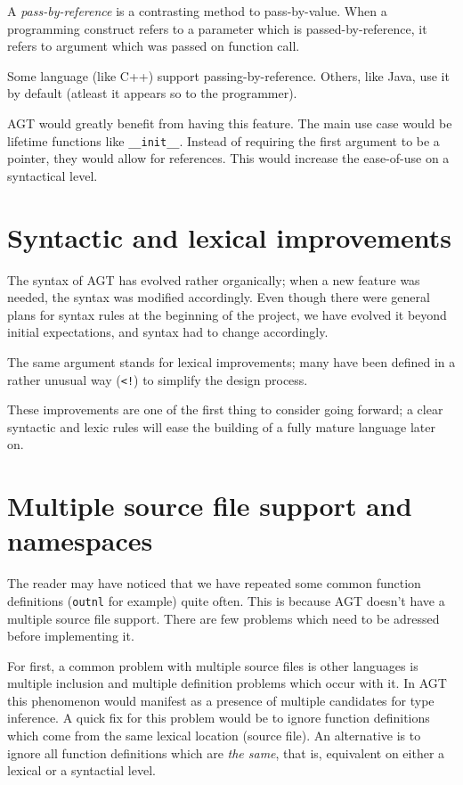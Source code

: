 \documentclass[times, utf8, diplomski]{fer}
\theoremstyle{definition}
\begin{document}
A \textit{pass-by-reference} is a contrasting method to pass-by-value. When a programming construct 
refers to a parameter which is passed-by-reference, it refers to argument which was passed on
function call.

Some language (like C++) support passing-by-reference. Others, like Java, use it by default 
(atleast it appears so to the programmer).

AGT would greatly benefit from having this feature. The main use case would be
lifetime functions like \texttt{\_\_init\_\_}. Instead of requiring the first argument to be a pointer,
they would allow for references. This would increase the ease-of-use on a syntactical level.

\section{Syntactic and lexical improvements}

The syntax of AGT has evolved rather organically; when a new feature was needed,
the syntax was modified accordingly. Even though there were general plans for syntax rules
at the beginning of the project, we have evolved it beyond initial expectations,
and syntax had to change accordingly.

The same argument stands for lexical improvements; many have been defined in a rather unusual way
(\texttt{<!}) to simplify the design process.

These improvements are one of the first thing to consider going forward;
a clear syntactic and lexic rules will ease the building of a fully mature language later on.

\section{Multiple source file support and namespaces}

The reader may have noticed that we have repeated some common function definitions
(\texttt{outnl} for example) quite often. This is because AGT doesn't have a multiple source file
support. There are few problems which need to be adressed before implementing it.

For first, a common problem with multiple source files is other languages is multiple inclusion
and multiple definition problems which occur with it. In AGT this phenomenon would manifest
as a presence of multiple candidates for type inference. A quick fix for this problem would be
to ignore function definitions which come from the same lexical location (source file).
An alternative is to ignore all function definitions which are \textit{the same}, that is,
equivalent on either a lexical or a syntactial level.
\end{document}
